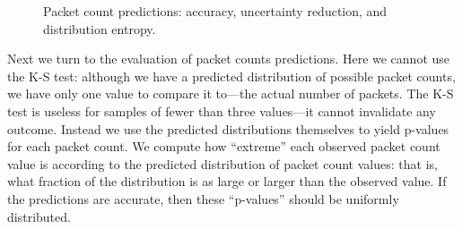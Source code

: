 \documentclass[conference]{IEEEtran}
\begin{document}
\begin{figure}[t]
\vspace{-1em}
\begin{center}
\caption{Packet count predictions: accuracy, uncertainty reduction, and distribution entropy.}
\end{center}
\vspace{-2em}
\end{figure}

Next we turn to the evaluation of packet counts predictions.
Here we cannot use the K-S test:
although we have a predicted distribution of possible packet counts, we have only one value to compare it to---the actual number of packets.
The K-S test is useless for samples of fewer than three values---it cannot invalidate any outcome.
Instead we use the predicted distributions themselves to yield p-values for each packet count.
We compute how ``extreme'' each observed packet count value is according to the predicted distribution of packet count values:
that is, what fraction of the distribution is as large or larger than the observed value.
If the predictions are accurate, then these ``p-values'' should be uniformly distributed.
\end{document}
